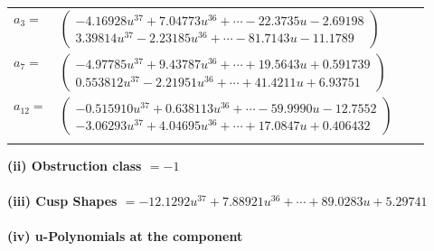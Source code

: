 \documentclass[1p]{elsarticle_modified}
\theoremstyle{definition}
\begin{document}
\begin{tabular}{m{7pt} m{180pt} m{7pt} m{180pt} }
\flushright $a_{3}=$&$\begin{pmatrix}-4.16928 u^{37}+7.04773 u^{36}+\cdots-22.3735 u-2.69198\\3.39814 u^{37}-2.23185 u^{36}+\cdots-81.7143 u-11.1789\end{pmatrix}$ \\
\flushright $a_{7}=$&$\begin{pmatrix}-4.97785 u^{37}+9.43787 u^{36}+\cdots+19.5643 u+0.591739\\0.553812 u^{37}-2.21951 u^{36}+\cdots+41.4211 u+6.93751\end{pmatrix}$ \\
\flushright $a_{12}=$&$\begin{pmatrix}-0.515910 u^{37}+0.638113 u^{36}+\cdots-59.9990 u-12.7552\\-3.06293 u^{37}+4.04695 u^{36}+\cdots+17.0847 u+0.406432\end{pmatrix}$\\&\end{tabular}
\flushleft \textbf{(ii) Obstruction class $= -1$}\\~\\
\flushleft \textbf{(iii) Cusp Shapes $= -12.1292 u^{37}+7.88921 u^{36}+\cdots+89.0283 u+5.29741$}\\~\\
\newpage\renewcommand{\arraystretch}{1}
\flushleft \textbf{(iv) u-Polynomials at the component}\newline \\
\end{document}
